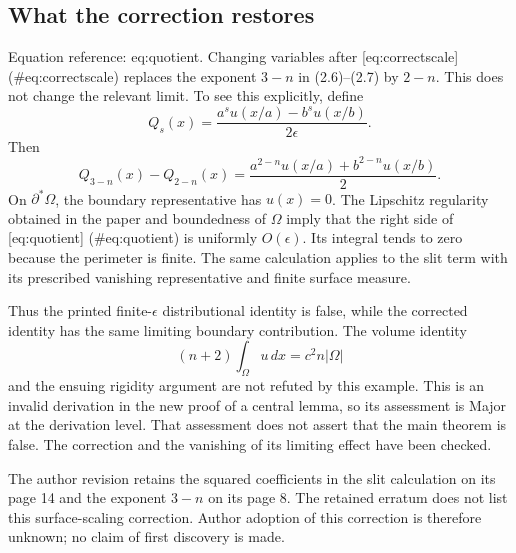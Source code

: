 \documentclass[10pt]{article}
\begin{document}
\subsection*{What the correction restores}
Equation reference: eq:quotient. Changing variables after [eq:correctscale] (\#eq:correctscale) replaces the exponent \(3-n\) in (2.6)–(2.7) by \(2-n\). This does not change the relevant limit. To see this explicitly, define \[Q_s(x)=
 \frac{a^s u(x/a)-b^s u(x/b)}{2\epsilon}.\] Then \[
 Q_{3-n}(x)-Q_{2-n}(x)
 =\frac{a^{2-n}u(x/a)+b^{2-n}u(x/b)}2.\] On \(\partial^*\Omega\), the boundary representative has \(u(x)=0\). The Lipschitz regularity obtained in the paper and boundedness of \(\Omega\) imply that the right side of [eq:quotient] (\#eq:quotient) is uniformly \(O(\epsilon)\). Its integral tends to zero because the perimeter is finite. The same calculation applies to the slit term with its prescribed vanishing representative and finite surface measure.\par
Thus the printed finite-\(\epsilon\) distributional identity is false, while the corrected identity has the same limiting boundary contribution. The volume identity \[(n+2)\int_\Omega u\,dx=c^2n|\Omega|\] and the ensuing rigidity argument are not refuted by this example. This is an invalid derivation in the new proof of a central lemma, so its assessment is Major at the derivation level. That assessment does not assert that the main theorem is false. The correction and the vanishing of its limiting effect have been checked.\par
The author revision retains the squared coefficients in the slit calculation on its page 14 and the exponent \(3-n\) on its page 8. The retained erratum does not list this surface-scaling correction. Author adoption of this correction is therefore unknown; no claim of first discovery is made.\par
\end{document}
